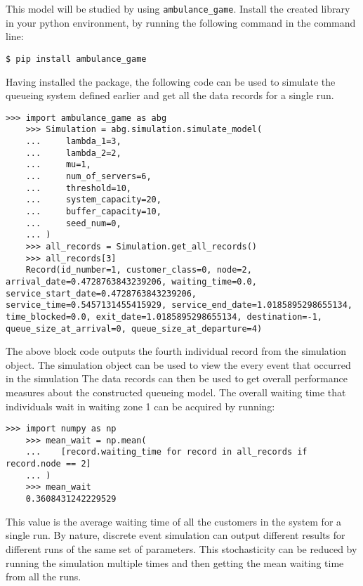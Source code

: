 This model will be studied by using  
\lstinline[style=pystyle]{ambulance_game}.
Install the created library in your python environment, by running the 
following command in the command line:
\begin{lstlisting}[style=terminalstyle]
    $ pip install ambulance_game
\end{lstlisting}

Having installed the package, the following code can be used to simulate the 
queueing system defined earlier and get all the data records for a single run.

\begin{lstlisting}[style=pystyle]
    >>> import ambulance_game as abg
    >>> Simulation = abg.simulation.simulate_model(
    ...     lambda_1=3,
    ...     lambda_2=2,
    ...     mu=1,
    ...     num_of_servers=6,
    ...     threshold=10,
    ...     system_capacity=20,
    ...     buffer_capacity=10,
    ...     seed_num=0,
    ... )
    >>> all_records = Simulation.get_all_records()
    >>> all_records[3]
    Record(id_number=1, customer_class=0, node=2, arrival_date=0.4728763843239206, waiting_time=0.0, service_start_date=0.4728763843239206, service_time=0.5457131455415929, service_end_date=1.0185895298655134, time_blocked=0.0, exit_date=1.0185895298655134, destination=-1, queue_size_at_arrival=0, queue_size_at_departure=4)

\end{lstlisting}

The above block code outputs the fourth individual record from the simulation
object.
The simulation object can be used to view the every event that occurred in the 
simulation 
The data records can then be used to get overall performance measures about the
constructed queueing model.
The overall waiting time that individuals wait in waiting zone 1 can be acquired 
by running:


\begin{lstlisting}[style=pystyle]
    >>> import numpy as np
    >>> mean_wait = np.mean(
    ...    [record.waiting_time for record in all_records if record.node == 2]
    ... )
    >>> mean_wait
    0.3608431242229529

\end{lstlisting}

This value is the average waiting time of all the customers in the system for a
single run. 
By nature, discrete event simulation can output different results for different
runs of the same set of parameters.
This stochasticity can be reduced by running the simulation multiple times 
and then getting the mean waiting time from all the runs.

